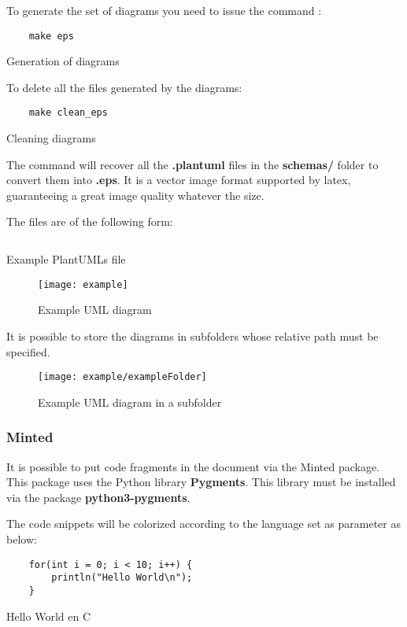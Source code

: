 To generate the set of diagrams you need to issue the command :
\begin{code}
    \begin{verbatim}
    make eps
\end{verbatim}
    \caption{Generation of diagrams}
\end{code}

To delete all the files generated by the diagrams:
\begin{code}
    \begin{verbatim}
    make clean_eps
\end{verbatim}
    \caption{Cleaning diagrams}
\end{code}

The command will recover all the \textbf{.plantuml} files
in the \textbf{schemas/} folder to convert them into \textbf{.eps}.
It is a vector image format supported by \gls{latex},
guaranteeing a great image quality whatever the size.

The files are of the following form:
\begin{code}
    \inputminted{vim}{../schemas/example.plantuml}
    \caption{Example PlantUMLs file}
\end{code}

\begin{figure}[H]
    \centering
    \texttt{[image: example]}
    \caption{Example UML diagram}
\end{figure}

It is possible to store the diagrams in subfolders whose relative path must be specified.
\begin{figure}[H]
    \centering
    \texttt{[image: example/exampleFolder]}
    \caption{Example UML diagram in a subfolder}
\end{figure}

\subsubsection{Minted}
It is possible to put code fragments in the document via the Minted package.
This package uses the Python library \textbf{Pygments}.
This library must be installed via the package \textbf{python3-pygments}.

The code snippets will be colorized according to the language set as parameter as below:

\begin{code}
    \begin{verbatim}
    for(int i = 0; i < 10; i++) {
        println("Hello World\n");
    }
\end{verbatim}
    \caption{Hello World en C}
\end{code}

